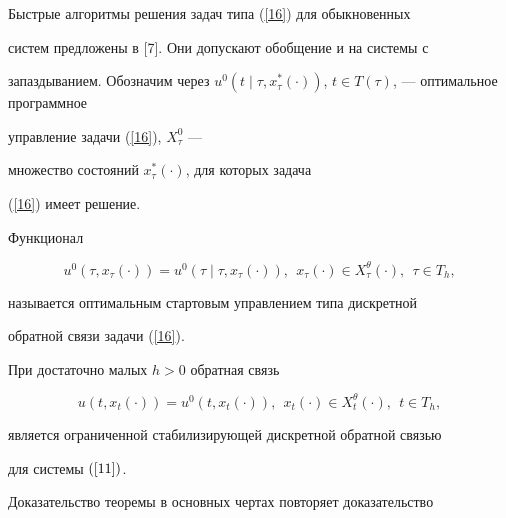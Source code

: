 Быстрые алгоритмы решения задач типа (\ref{16}) для обыкновенных


систем предложены в [7]. Они допускают обобщение и на системы с


запаздыванием. Обозначим через $u^0(t\mid\tau, x_{\tau}^*(\cdot))$, $t


\in T(\tau)$, --- оптимальное программное


управление задачи (\ref{16}), $X_{\tau}^{0}$ ---


множество состояний $x_{\tau}^{*}(\cdot)$, для которых задача


(\ref{16}) имеет решение.





\begin{defns}


Функционал


\begin{equation}\label{17}


u^{0}(\tau, x_{\tau}(\cdot)) = u^{0}(\tau\mid\tau, x_{\tau}(\cdot)),


\ \ x_{\tau}(\cdot) \in X_{\tau}^{\theta}(\cdot),\ \ \tau \in T_{h},


\end{equation}


называется оптимальным стартовым управлением типа дискретной


обратной связи задачи (\ref{16}).


\end{defns}





\begin{thms}


При достаточно малых $h>0$ обратная связь


$$


u(t, x_{t}(\cdot))=u^0(t,x_{t}(\cdot)),


\ \ x_{t}(\cdot) \in X_{t}^{\theta}(\cdot),\ \ t \in T_{h},


$$


является ограниченной стабилизирующей дискретной обратной связью


для системы $(\ref{11})$.


\end{thms}





Доказательство теоремы в основных чертах повторяет доказательство


